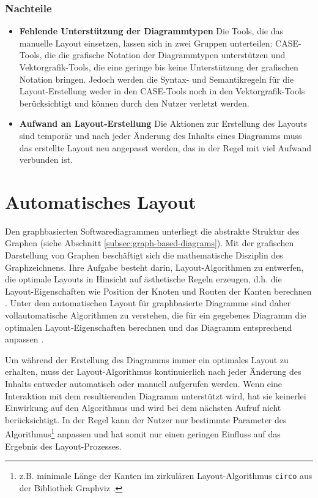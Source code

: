\subsubsection{Nachteile}

\begin{itemize}
    \item \textbf{Fehlende Unterstützung der Diagrammtypen} Die Tools, die das manuelle Layout einsetzen, lassen sich in zwei Gruppen unterteilen: CASE-Tools, die die grafische Notation der Diagrammtypen unterstützen und Vektorgrafik-Tools, die eine geringe bis keine Unterstützung der grafischen Notation bringen. Jedoch werden die Syntax- und Semantikregeln für die Layout-Erstellung weder in den CASE-Tools noch in den Vektorgrafik-Tools berücksichtigt und können durch den Nutzer verletzt werden.    
    \item \textbf{Aufwand an Layout-Erstellung} Die Aktionen zur Erstellung des Layouts sind temporär und nach jeder Änderung des Inhalts eines Diagramms muss das erstellte Layout neu angepasst werden, das in der Regel mit viel Aufwand verbunden ist.
\end{itemize}

\section{Automatisches Layout}
\label{sec:automatic-layout}

Den graphbasierten Softwarediagrammen unterliegt die abstrakte Struktur des Graphen (siehe Abschnitt \ref{subsec:graph-based-diagrams}). Mit der grafischen Darstellung von Graphen beschäftigt sich die mathematische Disziplin des Graphzeichnens. Ihre Aufgabe besteht darin, Layout-Algorithmen zu entwerfen, die optimale Layouts in Hinsicht auf ästhetische Regeln erzeugen, d.h. die Layout-Eigenschaften wie Position der Knoten und Routen der Kanten berechnen \cite{Eichelberger05Aesthetics, Arvo02Techniques, Siebenhaller03Automatisches, Maier12A-Pattern-based}. Unter dem automatischen Layout für graphbasierte Diagramme sind daher vollautomatische Algorithmen zu verstehen, die für ein gegebenes Diagramm die optimalen Layout-Eigenschaften berechnen und das Diagramm entsprechend anpassen \cite{Fuhrmann11On-the-Pragmatics}.

Um während der Erstellung des Diagramms immer ein optimales Layout zu erhalten, muss der Layout-Algorithmus kontinuierlich nach jeder Änderung des Inhalts entweder automatisch oder manuell aufgerufen werden. Wenn eine Interaktion mit dem resultierenden Diagramm unterstützt wird, hat sie keinerlei Einwirkung auf den Algorithmus und wird bei dem nächsten Aufruf nicht berücksichtigt. In der Regel kann der Nutzer nur bestimmte Parameter des Algorithmus\footnote{z.B. minimale Länge der Kanten im zirkulären Layout-Algorithmus \lstinline{circo} aus der Bibliothek Graphviz \cite{NorthGansner14Dot-Manual}.} anpassen und hat somit nur einen geringen Einfluss auf das Ergebnis des Layout-Prozesses.

